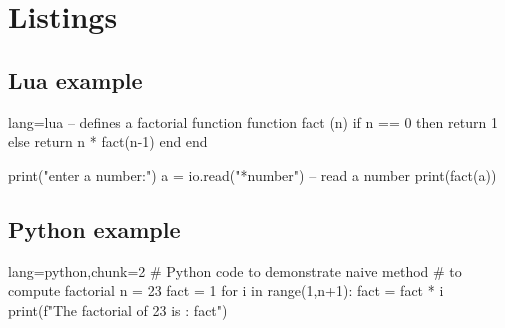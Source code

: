 \documentclass{article}
\begin{document}
\section{Listings}
\subsection{Lua example}
\begin{InlineCode}{lang=lua}
-- defines a factorial function
function fact (n)
  if n == 0 then
    return 1
  else
    return n * fact(n-1)
  end
end
  
print("enter a number:")
a = io.read("*number")        -- read a number
print(fact(a))
\end{InlineCode}
\subsection{Python example}
\begin{InlineCode}{lang=python,chunk=2}
# Python code to demonstrate naive method
# to compute factorial
n = 23
fact = 1
for i in range(1,n+1):
  fact = fact * i
print(f"The factorial of 23 is : {fact}")
\end{InlineCode}
\end{document}
